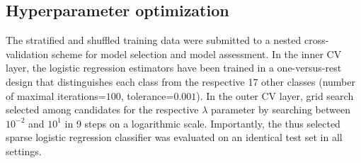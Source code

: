 \documentclass{article}
\begin{document}
\subsection{Hyperparameter optimization}
The stratified and shuffled training data were submitted
to a nested cross-validation scheme
for model selection and model assessment.
In the inner CV layer, the logistic regression estimators
have been trained in a one-versus-rest design that
distinguishes each class from
the respective 17 other classes
(number of maximal iterations=$100$, tolerance=$0.001$).
{\color{red} In the outer CV layer, grid search
selected among candidates for the respective $\lambda$ parameter
by searching between $10^{-2}$ and $10^{1}$ in 9 steps on a logarithmic scale.}
Importantly, the thus selected sparse logistic regression classifier was
evaluated on an identical test set in all settings.
\end{document}
